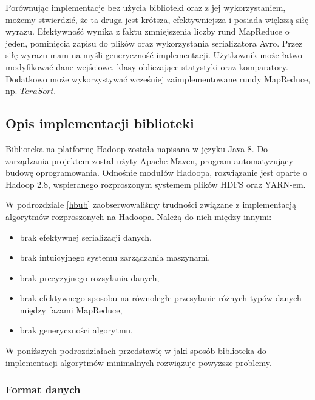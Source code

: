 \documentclass[magisterska]{pracamgr}
\begin{document}
Porównując implementacje bez użycia biblioteki oraz z jej wykorzystaniem, możemy stwierdzić, że ta druga jest krótsza, efektywniejsza i posiada większą siłę wyrazu. Efektywność wynika z faktu zmniejszenia liczby rund MapReduce o jeden, pominięcia zapisu do plików oraz wykorzystania serializatora Avro. Przez siłę wyrazu mam na myśli generyczność implementacji. Użytkownik może łatwo modyfikować dane wejściowe, klasy obliczające statystyki oraz komparatory. Dodatkowo może wykorzystywać wcześniej zaimplementowane rundy MapReduce, np. \(TeraSort\).

\subsection{Opis implementacji biblioteki}
Biblioteka na platformę Hadoop została napisana w języku Java 8. Do zarządzania projektem został użyty Apache Maven, program automatyzujący budowę oprogramowania. Odnośnie modułów Hadoopa, rozwiązanie jest oparte o Hadoop 2.8, wspieranego rozproszonym systemem plików HDFS oraz YARN-em.

W podrozdziale \ref{hbub} zaobserwowaliśmy trudności związane z implementacją algorytmów rozproszonych na Hadoopa. Należą do nich między innymi:
\begin{itemize}
    \item brak efektywnej serializacji danych,
    \item brak intuicyjnego systemu zarządzania maszynami,
    \item brak precyzyjnego rozsyłania danych,
    \item brak efektywnego sposobu na równoległe przesyłanie różnych typów danych między fazami MapReduce,
    \item brak generyczności algorytmu.
\end{itemize}
W poniższych podrozdziałach przedstawię w jaki sposób biblioteka do implementacji algorytmów minimalnych rozwiązuje powyższe problemy.

\subsubsection{Format danych} \label{hadoop_format_danych}
\end{document}
